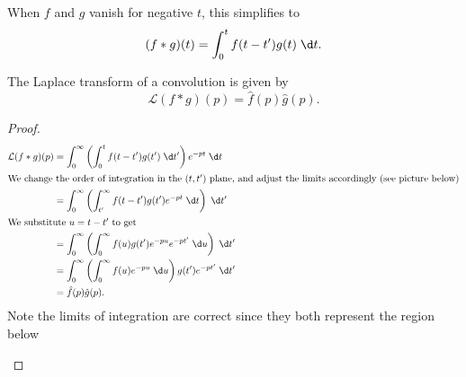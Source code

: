 \documentclass[a4paper]{article}
\begin{document}
When $f$ and $g$ vanish for negative $t$, this simplifies to
\[
  (f * g) (t) = \int_0^t f(t - t') g(t) \;\d t.
\]
\begin{thm}
  The Laplace transform of a convolution is given by
  \[
    \mathcal{L}(f * g)(p) = \hat{f}(p) \hat{g}(p).
  \]
\end{thm}

\begin{proof}
  \begin{align*}
    \mathcal{L}(f * g)(p) &= \int_0^\infty \left(\int_0^t f(t - t') g(t') \;\d t'\right) e^{-pt} \;\d t\\
    \intertext{We change the order of integration in the $(t, t')$ plane, and adjust the limits accordingly (see picture below)}
    &= \int_0^\infty \left(\int_{t'}^\infty f(t - t') g(t') e^{-pt} \;\d t\right) \;\d t'\\
    \intertext{We substitute $u = t - t'$ to get}
    &= \int_0^\infty \left(\int_0^\infty f(u) g(t') e^{-pu}e^{-pt'} \;\d u\right)\;\d t'\\
    &= \int_0^\infty \left(\int_0^\infty f(u) e^{-pu} \;\d u\right) g(t') e^{-pt'} \;\d t'\\
    &= \hat{f}(p) \hat{g}(p).
  \end{align*}
  Note the limits of integration are correct since they both represent the region below
  \begin{center}
  \end{center}
\end{proof}
\end{document}
